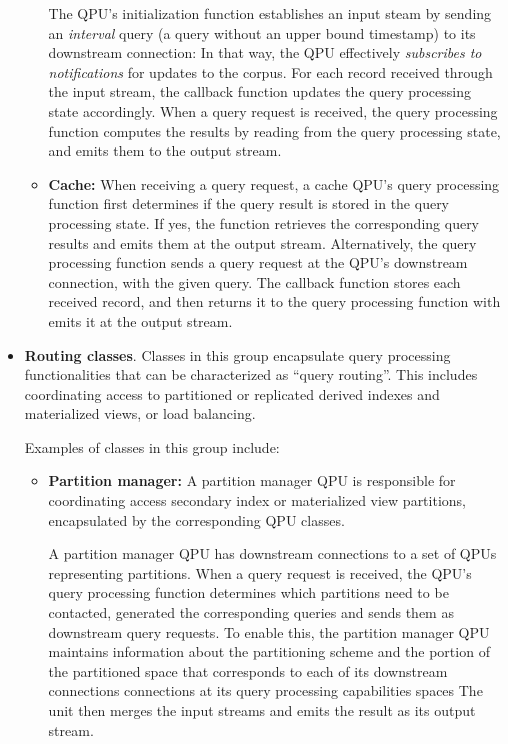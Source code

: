 \begin{itemize}
\begin{itemize}
    The QPU's initialization function establishes an input steam by sending an \textit{interval} query
    (a query without an upper bound timestamp) to its downstream connection:
    In that way, the QPU effectively \textit{subscribes to notifications} for updates to the corpus.
    For each record received through the input stream, the callback function updates the query processing state accordingly.
    When a query request is received,
    the query processing function computes the results by reading from the query processing state,
    and emits them to the output stream.

    \item \textbf{Cache:}
    When receiving a query request, a cache QPU's query processing function first determines if the query result is stored
    in the query processing state.
    If yes, the function retrieves the corresponding query results and emits them at the output stream.
    Alternatively, the query processing function sends a query request at the QPU's downstream connection,
    with the given query.
    The callback function stores each received record, and then returns it to the query processing function with emits it
    at the output stream.
    \end{itemize}

  \item \textbf{Routing classes}.
  Classes in this group encapsulate query processing functionalities that can be characterized as ``query routing''.
  This includes coordinating access to partitioned or replicated derived indexes and materialized views,
  or load balancing.

  Examples of classes in this group include:
  \begin{itemize}
    \item \textbf{Partition manager:}
    A partition manager QPU is responsible for coordinating access secondary index or materialized view partitions,
    encapsulated by the corresponding QPU classes.

    A partition manager QPU has downstream connections to a set of QPUs representing partitions.
    When a query request is received, the QPU's query processing function determines which partitions need to be contacted,
    generated the corresponding queries and sends them as downstream query requests.
    To enable this, the partition manager QPU maintains information about the partitioning scheme and the portion of
    the partitioned space that corresponds to each of its downstream connections connections at its query processing
    capabilities spaces
    The unit then merges the input streams and emits the result as its output stream.


\end{itemize}
\end{itemize}
